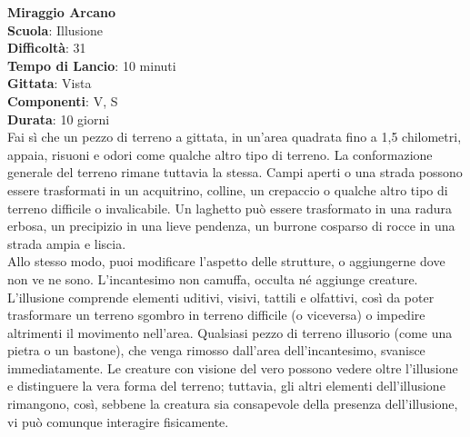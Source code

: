 \begin{multicols}{2}
\medskip\textbf{Miraggio Arcano}\\
\textbf{Scuola}: Illusione\\
\textbf{Difficoltà}: 31\\
\textbf{Tempo di Lancio}: 10 minuti\\
\textbf{Gittata}: Vista\\
\textbf{Componenti}: V, S\\
\textbf{Durata}: 10 giorni\\
Fai sì che un pezzo di terreno a gittata, in un'area quadrata fino a 1,5 chilometri, appaia, risuoni e odori come qualche altro tipo di terreno. La conformazione generale del terreno rimane tuttavia la stessa. Campi aperti o una strada possono essere trasformati in un acquitrino, colline, un crepaccio o qualche altro tipo di terreno difficile o invalicabile. Un laghetto può essere trasformato in una radura erbosa, un precipizio in una lieve pendenza, un burrone cosparso di rocce in una strada ampia e liscia.\\
Allo stesso modo, puoi modificare l'aspetto delle strutture, o aggiungerne dove non ve ne sono. L'incantesimo non camuffa, occulta né aggiunge creature.\\
L'illusione comprende elementi uditivi, visivi, tattili e olfattivi, così da poter trasformare un terreno sgombro in terreno difficile (o viceversa) o impedire altrimenti il movimento nell'area. Qualsiasi pezzo di terreno illusorio (come una pietra o un bastone), che venga rimosso dall'area dell'incantesimo, svanisce immediatamente. Le creature con visione del vero possono vedere oltre l'illusione e distinguere la vera forma del terreno; tuttavia, gli altri elementi dell'illusione rimangono, così, sebbene la creatura sia consapevole della presenza dell'illusione, vi può comunque interagire fisicamente. 


\end{multicols}
